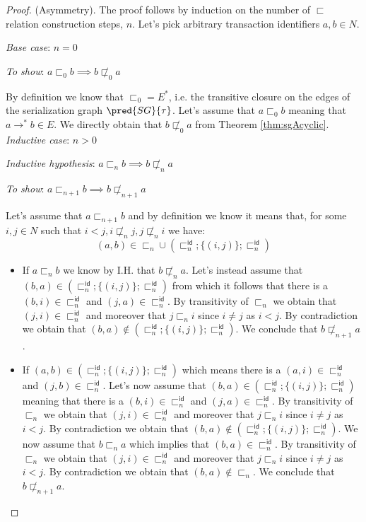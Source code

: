 \begin{thm}
\begin{proof}
	(Asymmetry). The proof follows by induction on the number of $\sqsubset$ relation construction steps, $n$. Let's pick arbitrary transaction identifiers $a, b \in N$.
	
	{\parindent0pt
	\textit{Base case}: $n = 0$
	
	\textit{To show}: $a \sqsubset_0 b \implies b \not\sqsubset_0 a$
	
	By definition we know that $\sqsubset_0 = E^*$, i.e. the transitive closure on the edges of the serialization graph $\pred{SG}{\tau}$. Let's assume that $a \sqsubset_0 b$ meaning that $a \rightarrow^* b \in E$. We directly obtain that $b \not\sqsubset_0 a$ from Theorem \ref{thm:sgAcyclic}. \\
	
	\textit{Inductive case}: $n > 0$
	
	\textit{Inductive hypothesis}: $a \sqsubset_n b \implies b \not\sqsubset_n a$
	
	\textit{To show}: $a \sqsubset_{n + 1} b \implies b \not\sqsubset_{n + 1} a$
	
	Let's assume that $a \sqsubset_{n + 1} b$ and by definition we know it means that, for some $i, j \in N$ such that $i < j, i \not\sqsubset_n j, j \not\sqsubset_n i$ we have:
	\[
		(a, b) \in \sqsubset_n \cup \left( \sqsubset_n^\mathsf{id} ; \{ (i, j) \} ; \sqsubset_n ^\mathsf{id} \right)
	\]
	\begin{itemize}
		\item If $a \sqsubset_n b$ we know by I.H. that $b \not\sqsubset_n a$. Let's instead assume that $(b, a) \in \left( \sqsubset_n^\mathsf{id} ; \{ (i, j) \} ; \sqsubset_n ^\mathsf{id} \right)$ from which it follows that there is a $(b, i) \in \sqsubset_n^\mathsf{id}$ and $(j, a) \in \sqsubset_n^\mathsf{id}$. By transitivity of $\sqsubset_n$ we obtain that $(j, i) \in \sqsubset_n^\mathsf{id}$ and moreover that $j \sqsubset_n i$ since $i \neq j$ as $i < j$. By contradiction we obtain that $(b, a) \not\in \left( \sqsubset_n^\mathsf{id} ; \{ (i, j) \} ; \sqsubset_n ^\mathsf{id} \right)$. We conclude that $b \not\sqsubset_{n + 1} a$.
		\item If $(a, b) \in \left( \sqsubset_n^\mathsf{id} ; \{ (i, j) \} ; \sqsubset_n ^\mathsf{id} \right)$ which means there is a $(a, i) \in \sqsubset_n^\mathsf{id}$ and $(j, b) \in \sqsubset_n^\mathsf{id}$. Let's now assume that $(b, a) \in \left( \sqsubset_n^\mathsf{id} ; \{ (i, j) \} ; \sqsubset_n ^\mathsf{id} \right)$ meaning that there is a $(b, i) \in \sqsubset_n^\mathsf{id}$ and $(j, a) \in \sqsubset_n^\mathsf{id}$. By transitivity of $\sqsubset_n$ we obtain that $(j, i) \in \sqsubset_n^\mathsf{id}$ and moreover that $j \sqsubset_n i$ since $i \neq j$ as $i < j$. By contradiction we obtain that $(b, a) \not\in \left( \sqsubset_n^\mathsf{id} ; \{ (i, j) \} ; \sqsubset_n ^\mathsf{id} \right)$. We now assume that $b \sqsubset_n a$ which implies that $(b, a) \in \sqsubset_n^\mathsf{id}$. By transitivity of $\sqsubset_n$ we obtain that $(j, i) \in \sqsubset_n^\mathsf{id}$ and moreover that $j \sqsubset_n i$ since $i \neq j$ as $i < j$. By contradiction we obtain that $(b, a) \not\in \sqsubset_n$. We conclude that $b \not\sqsubset_{n + 1} a$.
	\end{itemize}
	}
	

\end{proof}
\end{thm}
